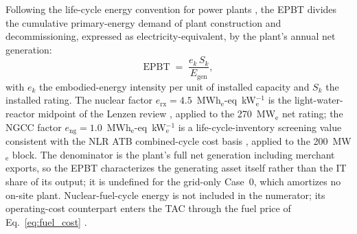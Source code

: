 Following the life-cycle energy convention for power plants \citep{lenzen2008nuclear}, the EPBT divides the cumulative primary-energy demand of plant construction and decommissioning, expressed as electricity-equivalent, by the plant's annual net generation:
\begin{equation}
\label{eq:epbt}
\mathrm{EPBT} \;=\; \frac{e_k\, S_k}{E_\mathrm{gen}},
\end{equation}
with $e_k$ the embodied-energy intensity per unit of installed capacity and $S_k$ the installed rating. The nuclear factor $e_\mathrm{rx}=4.5$~MWh$_\mathrm{e}$-eq~kW$_\mathrm{e}^{-1}$ is the light-water-reactor midpoint of the Lenzen review \citep{lenzen2008nuclear}, applied to the 270~MW$_\mathrm{e}$ net rating; the NGCC factor $e_\mathrm{ng}=1.0$~MWh$_\mathrm{e}$-eq~kW$_\mathrm{e}^{-1}$ is a life-cycle-inventory screening value consistent with the NLR ATB combined-cycle cost basis \citep{atb2024nuclear}, applied to the 200~MW$_\mathrm{e}$ block. The denominator is the plant's full net generation including merchant exports, so the EPBT characterizes the generating asset itself rather than the IT share of its output; it is undefined for the grid-only Case~0, which amortizes no on-site plant. Nuclear-fuel-cycle energy is not included in the numerator; its operating-cost counterpart enters the TAC through the fuel price of Eq.~\eqref{eq:fuel_cost} \citep{li2026nuclearH2}.

